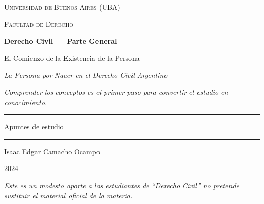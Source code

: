 \documentclass[12pt,oneside]{book}
\newcommand{\universidad}{Universidad de Buenos Aires (UBA)}
\newcommand{\facultad}{Facultad de Derecho}
\newcommand{\materia}{Derecho Civil --- Parte General}
\newcommand{\titulo}{El Comienzo de la Existencia de la Persona}
\newcommand{\subtitulo}{La Persona por Nacer en el Derecho Civil Argentino}
\newcommand{\autor}{Isaac Edgar Camacho Ocampo}
\newcommand{\anio}{2024}
\begin{document}
\begin{titlepage}

\thispagestyle{empty}

\begin{center}

\vspace*{1cm}

{\large \textsc{\universidad}}

\vspace{0.2cm}

{\large \textsc{\facultad}}

\vspace{3cm}

{\Huge \textbf{\materia}}

\vspace{1cm}

{\LARGE \titulo}

\vspace{0.4cm}

{\large \textit{\subtitulo}}

\vspace{0.8cm}

\textit{Comprender los conceptos es el primer paso para convertir el estudio en conocimiento.}

\vspace{1.2cm}

\rule{0.70\textwidth}{0.5pt}

\vspace{0.5cm}

{\large Apuntes de estudio}

\vspace{0.5cm}

\rule{0.70\textwidth}{0.5pt}

\vfill

{\large \autor}

\vspace{0.3cm}

{\large \anio}

\end{center}

\vfill

\begin{flushleft}
\textit{Este es un modesto aporte a los estudiantes de ``Derecho Civil'' no pretende sustituir el material oficial de la materia.}
\end{flushleft}

\end{titlepage}
\end{document}
